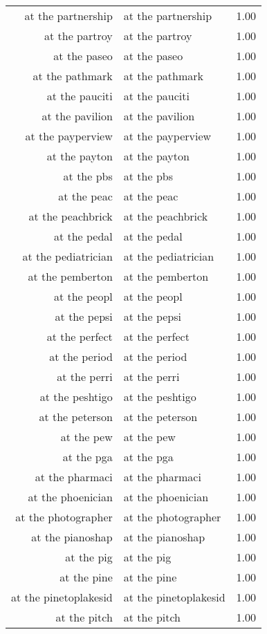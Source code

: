 \begin{table}[ht]
\begin{tabular}{rlr}
  at the partnership & at the partnership & 1.00 \\ 
  at the partroy & at the partroy & 1.00 \\ 
  at the paseo & at the paseo & 1.00 \\ 
  at the pathmark & at the pathmark & 1.00 \\ 
  at the pauciti & at the pauciti & 1.00 \\ 
  at the pavilion & at the pavilion & 1.00 \\ 
  at the payperview & at the payperview & 1.00 \\ 
  at the payton & at the payton & 1.00 \\ 
  at the pbs & at the pbs & 1.00 \\ 
  at the peac & at the peac & 1.00 \\ 
  at the peachbrick & at the peachbrick & 1.00 \\ 
  at the pedal & at the pedal & 1.00 \\ 
  at the pediatrician & at the pediatrician & 1.00 \\ 
  at the pemberton & at the pemberton & 1.00 \\ 
  at the peopl & at the peopl & 1.00 \\ 
  at the pepsi & at the pepsi & 1.00 \\ 
  at the perfect & at the perfect & 1.00 \\ 
  at the period & at the period & 1.00 \\ 
  at the perri & at the perri & 1.00 \\ 
  at the peshtigo & at the peshtigo & 1.00 \\ 
  at the peterson & at the peterson & 1.00 \\ 
  at the pew & at the pew & 1.00 \\ 
  at the pga & at the pga & 1.00 \\ 
  at the pharmaci & at the pharmaci & 1.00 \\ 
  at the phoenician & at the phoenician & 1.00 \\ 
  at the photographer & at the photographer & 1.00 \\ 
  at the pianoshap & at the pianoshap & 1.00 \\ 
  at the pig & at the pig & 1.00 \\ 
  at the pine & at the pine & 1.00 \\ 
  at the pinetoplakesid & at the pinetoplakesid & 1.00 \\ 
  at the pitch & at the pitch & 1.00 \\ 

\end{tabular}
\end{table}
